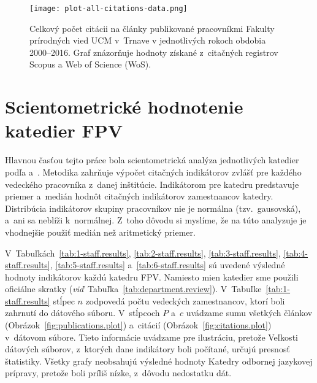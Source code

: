 \begin{figure}
  \centering
  \texttt{[image: plot-all-citations-data.png]}
  \caption[Citovanosť článkov všetkých pracovníkov FPV za obdobie 2000--2016]%
  {Celkový počet citácii na články publikované pracovníkmi Fakulty prírodných
    vied UCM v~Trnave v jednotlivých rokoch obdobia 2000--2016.  Graf znázorňuje
    hodnoty získané z~citač\-ných registrov Scopus a Web of Science (WoS).}
  \label{fig:all.citations.plot}
\end{figure}


\section{Scientometrické hodnotenie katedier FPV}

Hlavnou časťou tejto práce bola scientometrická analýza jednotlivých katedier
podľa \citet{Kazakis2014a} a~\citet{Kazakis2014b,Kazakis2015}.  Metodika
zahrňuje výpočet citačných indikátorov zvlášť pre každého vedeckého pracovníka
z~danej inštitúcie.  Indikátorom pre katedru predstavuje priemer a~medián hodnôt
citačných indikátorov zamestnancov katedry.  Distribúcia indikátorov skupiny
pracovníkov nie je normálna (tzv.~gausovská), a~ani sa neblíži k~normálnej.
Z~toho dôvodu si myslíme, že na túto analyzuje je vhodnejšie použiť medián než
aritmetický priemer.

V~Tabuľkách~\ref{tab:1-staff.results}, \ref{tab:2-staff.results},
\ref{tab:3-staff.results}, \ref{tab:4-staff.results}, \ref{tab:5-staff.results}
a~\ref{tab:6-staff.results} sú uvedené výsledné hodnoty indikátorov každú
katedru FPV.  Namiesto mien katedier sme použili oficiálne skratky
(\emph{viď}~Tabuľka~\ref{tab:department.review}).
V~Tabuľke~\ref{tab:1-staff.results} stĺpec $n$ zodpovedá počtu vedeckých
zamestnancov, ktorí boli zahrnutí do dátového súboru.  V~stĺpcoch $P$ a~$c$
uvádzame sumu všetkých článkov (Obrázok~\ref{fig:publications.plot}) a~citácií
(Obrázok~\ref{fig:citations.plot}) v~dátovom súbore.  Tieto informácie uvádzame
pre ilustráciu, pretože Veľkosti dátových súborov, z~ktorých dane indikátory
boli počítané, určujú presnosť štatistiky.  Všetky grafy neobsahujú výsledné
hodnoty Katedry odbornej jazykovej prípravy, pretože boli príliš nízke, z~dôvodu
nedostatku dát.

